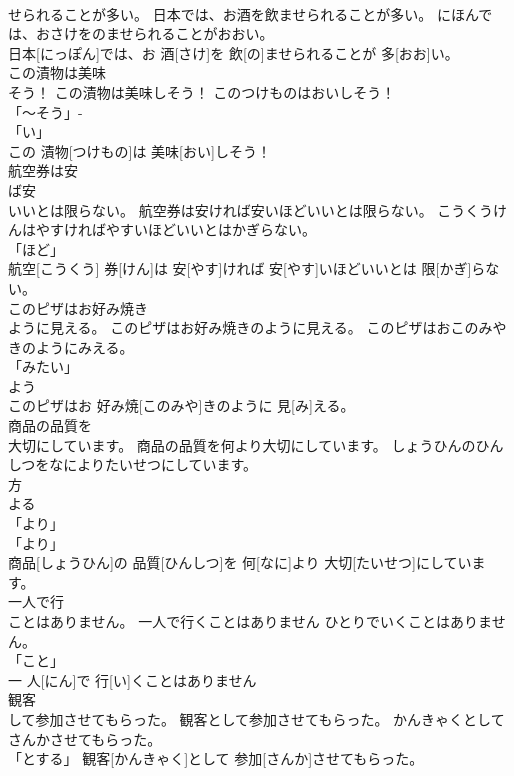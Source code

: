 \documentclass[8pt]{extreport}
\begin{document}
\begin{CJK}{UTF8}{min}
\\	せられることが多い。	日本では、お酒を飲ませられることが多い。	にほんでは、おさけをのませられることがおおい。	
\\	日本[にっぽん]では、お 酒[さけ]を 飲[の]ませられることが 多[おお]い。		
\\	この漬物は美味
\\	そう！	この漬物は美味しそう！	このつけものはおいしそう！	
\\	「～そう」- 
\\	「い」 
\\	この 漬物[つけもの]は 美味[おい]しそう！		
\\	航空券は安
\\	ば安
\\	いいとは限らない。	航空券は安ければ安いほどいいとは限らない。	こうくうけんはやすければやすいほどいいとはかぎらない。	
\\	「ほど」 
\\	航空[こうくう] 券[けん]は 安[やす]ければ 安[やす]いほどいいとは 限[かぎ]らない。		
\\	このピザはお好み焼き
\\	ように見える。	このピザはお好み焼きのように見える。	このピザはおこのみやきのようにみえる。	
\\	「みたい」 
\\	よう 
\\	このピザはお 好み焼[このみや]きのように 見[み]える。		
\\	商品の品質を
\\	大切にしています。	商品の品質を何より大切にしています。	しょうひんのひんしつをなによりたいせつにしています。	
\\	方 
\\	よる 
\\	「より」 
\\	「より」 
\\	商品[しょうひん]の 品質[ひんしつ]を 何[なに]より 大切[たいせつ]にしています。		
\\	一人で行
\\	ことはありません。	一人で行くことはありません	ひとりでいくことはありません。	
\\	「こと」 
\\	一 人[にん]で 行[い]くことはありません		
\\	観客
\\	して参加させてもらった。	観客として参加させてもらった。	かんきゃくとしてさんかさせてもらった。	
\\	「とする」	観客[かんきゃく]として 参加[さんか]させてもらった。		

\end{CJK}
\end{document}
